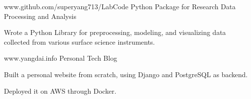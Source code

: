 


\begin{cventries}


\cventry
{www.github.com/superyang713/LabCode}
{Python Package for Research Data Processing and Analysis}
{}
{}
{
\begin{cvitems}
\item {Wrote a Python Library for preprocessing, modeling, and visualizing data
    collected from various surface science instruments.}
\end{cvitems}
}


\cventry
{www.yangdai.info}
{Personal Tech Blog}
{}
{}
{
\begin{cvitems}
\item {Built a personal website from scratch, using Django and PostgreSQL
    as backend.}
\item {Deployed it on AWS through Docker.}
\end{cvitems}
}


\end{cventries}


